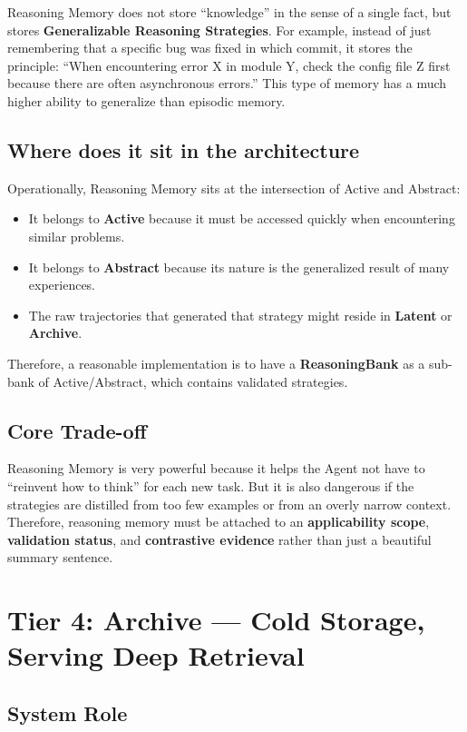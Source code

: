 \documentclass[a4paper,12pt]{article}
\begin{document}
Reasoning Memory does not store ``knowledge'' in the sense of a single fact, but stores \textbf{Generalizable Reasoning Strategies}. For example, instead of just remembering that a specific bug was fixed in which commit, it stores the principle: ``When encountering error X in module Y, check the config file Z first because there are often asynchronous errors.'' This type of memory has a much higher ability to generalize than episodic memory.

\subsection*{Where does it sit in the architecture}

Operationally, Reasoning Memory sits at the intersection of Active and Abstract:
\begin{itemize}
    \item It belongs to \textbf{Active} because it must be accessed quickly when encountering similar problems.
    \item It belongs to \textbf{Abstract} because its nature is the generalized result of many experiences.
    \item The raw trajectories that generated that strategy might reside in \textbf{Latent} or \textbf{Archive}.
\end{itemize}

Therefore, a reasonable implementation is to have a \textbf{ReasoningBank} as a sub-bank of Active/Abstract, which contains validated strategies.

\subsection*{Core Trade-off}

Reasoning Memory is very powerful because it helps the Agent not have to ``reinvent how to think'' for each new task. But it is also dangerous if the strategies are distilled from too few examples or from an overly narrow context. Therefore, reasoning memory must be attached to an \textbf{applicability scope}, \textbf{validation status}, and \textbf{contrastive evidence} rather than just a beautiful summary sentence.

\section{Tier 4: Archive --- Cold Storage, Serving Deep Retrieval}

\subsection*{System Role}
\end{document}
